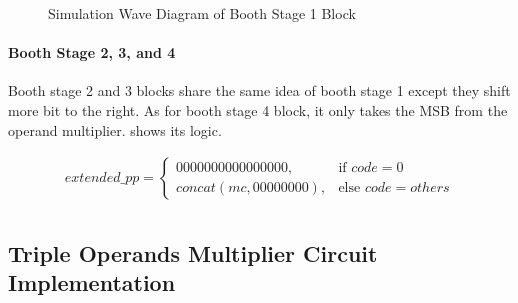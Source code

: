 \begin{figure}[!ht]
	\centering
	\caption{Simulation Wave Diagram of Booth Stage 1 Block}

	\hspace{0.5cm}

	\label{fig:booth_stage_1_sim}
\end{figure}

\paragraph{Booth Stage 2, 3, and 4}
Booth stage 2 and 3 blocks share the same idea of booth stage 1 except they shift more bit to the right.
As for booth stage 4 block, it only takes the MSB from the operand multiplier.  shows its logic.

\begin{equation}
	\begin{array}{c}
		extended\_pp =
		\begin{cases}
			0000000000000000,    & \text{if } code = 0        \\
			concat(mc,00000000), & \text{else } code = others
		\end{cases} \\
	\end{array}
	\label{exp:booth_stage_4}
\end{equation}

\subsection{Triple Operands Multiplier Circuit Implementation}

